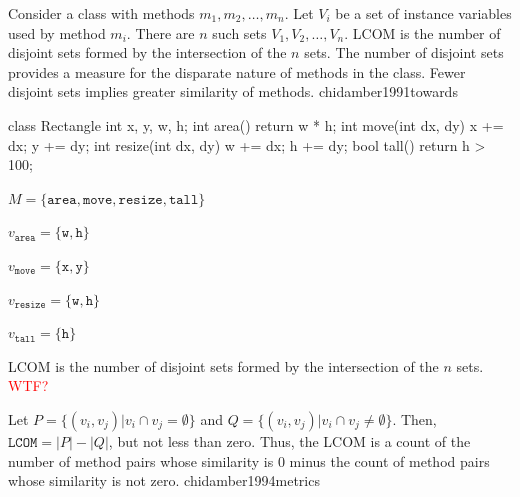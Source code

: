 \documentclass{article}
\begin{document}
  {Consider a class with methods \(m_1, m_2, \dots, m_n\). Let \(V_i\) be a set of instance variables used by method \(m_i\). There are \(n\) such sets \(V_1, V_2, \dots, V_n\). LCOM is the number of disjoint sets formed by the intersection of the \(n\) sets. The number of disjoint sets provides a measure for the disparate nature of methods in the class. Fewer disjoint sets implies greater similarity of methods.}
  {chidamber1991towards}

\begin{multicols}{2}
{\small\begin{ffcode}
class Rectangle {
  int x, y, w, h;
  int area() {
    return w * h; }
  int move(int dx, dy) {
    x += dx; y += dy; }
  int resize(int dx, dy) {
    w += dx; h += dy; }
  bool tall() {
    return h > 100; }
}
\end{ffcode}
}
\par\columnbreak\par
\( M = \{ \texttt{area}, \texttt{move}, \texttt{resize}, \texttt{tall} \} \) \par
\( v_\texttt{area} = \{ \texttt{w}, \texttt{h} \} \) \par
\( v_\texttt{move} = \{ \texttt{x}, \texttt{y} \} \) \par
\( v_\texttt{resize} = \{ \texttt{w}, \texttt{h} \} \) \par
\( v_\texttt{tall} = \{ \texttt{h} \} \) \par
LCOM is the number of disjoint sets formed by the intersection of the \(n\) sets. \textcolor{red}{WTF?}
\end{multicols}
\plush{}

  {Let \(P = \{ (v_i, v_j) | v_i \cap v_j = \emptyset \}\) and \(Q = \{ (v_i, v_j) | v_i \cap v_j \not= \emptyset \}\). Then, \( \texttt{LCOM} = |P| - |Q| \), but not less than zero. Thus, the LCOM is a count of the number of method pairs whose similarity is 0 minus the count of method pairs whose similarity is not zero.}
  {chidamber1994metrics}
\end{document}
